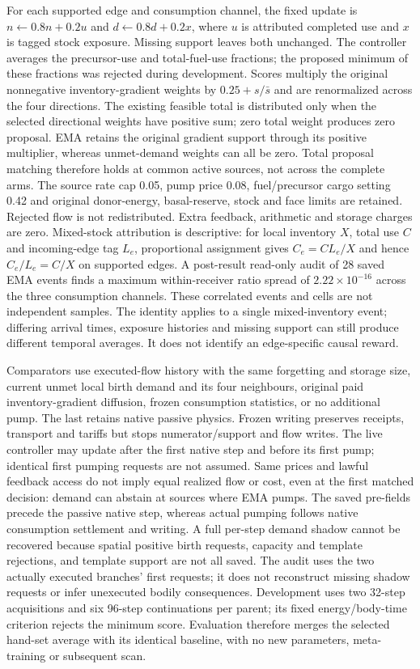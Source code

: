 For each supported edge and consumption channel, the fixed update is $n\leftarrow0.8n+0.2u$ and $d\leftarrow0.8d+0.2x$, where $u$ is attributed completed use and $x$ is tagged stock exposure. Missing support leaves both unchanged. The controller averages the precursor-use and total-fuel-use fractions; the proposed minimum of these fractions was rejected during development. Scores multiply the original nonnegative inventory-gradient weights by $0.25+s/\bar{s}$ and are renormalized across the four directions. The existing feasible total is distributed only when the selected directional weights have positive sum; zero total weight produces zero proposal. EMA retains the original gradient support through its positive multiplier, whereas unmet-demand weights can all be zero. Total proposal matching therefore holds at common active sources, not across the complete arms. The source rate cap 0.05, pump price 0.08, fuel/precursor cargo setting 0.42 and original donor-energy, basal-reserve, stock and face limits are retained. Rejected flow is not redistributed. Extra feedback, arithmetic and storage charges are zero. Mixed-stock attribution is descriptive: for local inventory $X$, total use $C$ and incoming-edge tag $L_e$, proportional assignment gives $C_e=C L_e/X$ and hence $C_e/L_e=C/X$ on supported edges. A post-result read-only audit of 28 saved EMA events finds a maximum within-receiver ratio spread of $2.22\times10^{-16}$ across the three consumption channels. These correlated events and cells are not independent samples. The identity applies to a single mixed-inventory event; differing arrival times, exposure histories and missing support can still produce different temporal averages. It does not identify an edge-specific causal reward.

Comparators use executed-flow history with the same forgetting and storage size, current unmet local birth demand and its four neighbours, original paid inventory-gradient diffusion, frozen consumption statistics, or no additional pump. The last retains native passive physics. Frozen writing preserves receipts, transport and tariffs but stops numerator/support and flow writes. The live controller may update after the first native step and before its first pump; identical first pumping requests are not assumed. Same prices and lawful feedback access do not imply equal realized flow or cost, even at the first matched decision: demand can abstain at sources where EMA pumps. The saved pre-fields precede the passive native step, whereas actual pumping follows native consumption settlement and writing. A full per-step demand shadow cannot be recovered because spatial positive birth requests, capacity and template rejections, and template support are not all saved. The audit uses the two actually executed branches' first requests; it does not reconstruct missing shadow requests or infer unexecuted bodily consequences. Development uses two 32-step acquisitions and six 96-step continuations per parent; its fixed energy/body-time criterion rejects the minimum score. Evaluation therefore merges the selected hand-set average with its identical baseline, with no new parameters, meta-training or subsequent scan.


